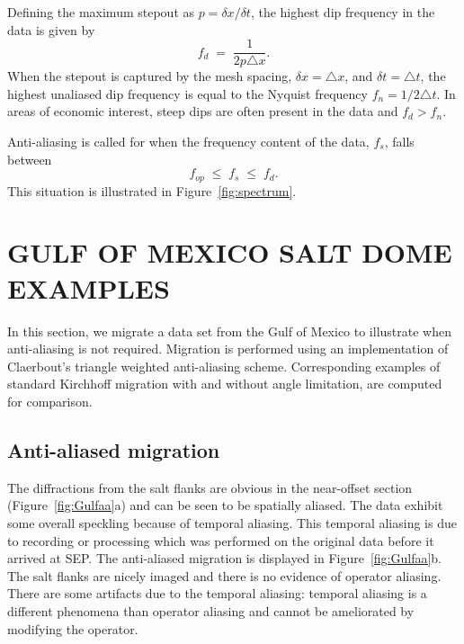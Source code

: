 Defining the maximum stepout as $p = \delta x /\delta t$, the
highest dip frequency in the data is given by 
\begin{equation}
f_d \; = \; \frac{1}{2 p \triangle x}.
\end{equation}
When the stepout is captured by the mesh 
spacing, $\delta x = \triangle x$, and $\delta t = \triangle t$, the
highest unaliased dip frequency is equal to the 
Nyquist frequency $f_n = 1/2\triangle t$. In areas of
economic interest, steep dips are often
present in the data and $f_d > f_n$.

Anti-aliasing is called for when the frequency content of the data, $f_s$, 
falls between 
\begin{equation}
\label{eqn:crit}
f_{op} \; \leq \; f_s \; \leq \; f_d.
\end{equation}
This situation is illustrated in Figure~\ref{fig:spectrum}.


\section{GULF OF MEXICO SALT DOME EXAMPLES}
In this section, we migrate a data set from the Gulf of Mexico to illustrate
when anti-aliasing is not required.  Migration is performed using
an implementation of Claerbout's triangle weighted anti-aliasing 
scheme.  Corresponding examples of standard Kirchhoff migration 
with and without angle limitation, are computed for
comparison.

\subsection{Anti-aliased migration}
The diffractions from the salt flanks are 
obvious in the near-offset section (Figure~\ref{fig:Gulfaa}a) and can be seen 
to be spatially aliased.  The data exhibit some overall 
speckling because of temporal aliasing. This temporal aliasing is due to 
recording or processing which was performed on the original data before
it arrived at SEP.
The anti-aliased migration is displayed in Figure~\ref{fig:Gulfaa}b. The 
salt flanks are nicely imaged and there is no evidence of operator aliasing.
There are some artifacts due to the temporal aliasing:
temporal aliasing is a different phenomena than operator aliasing and
cannot be ameliorated by modifying the operator.


